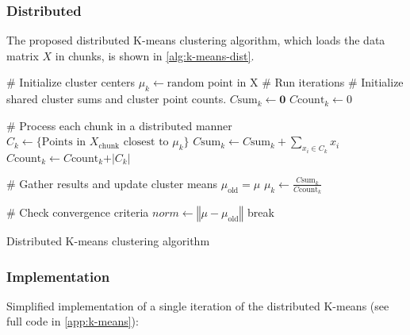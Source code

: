 \subsubsection{Distributed}

The proposed distributed K-means clustering algorithm, which loads the data matrix
$X$ in chunks, is shown in \cref{alg:k-means-dist}.
\begin{algorithm}[H]
  \begin{algorithmic}[1]
    \State \# Initialize cluster centers
      \State $\mu_k \gets \text{random point in X}$
    \EndFor
    \State \# Run iterations
      \State \# Initialize shared cluster sums and cluster point counts.
        \State $C\text{sum}_k \gets \mathbf{0}$
        \State $C\text{count}_k \gets 0$
      \EndFor

      \State \# Process each chunk in a distributed manner
          \State $C_k \gets \{\text{Points in }X_\text{chunk}\text{ closest to }\mu_k\}$
          \State $C\text{sum}_k \gets C\text{sum}_k + \sum_{x_i \in C_k} x_i$
          \State $C\text{count}_k \gets C\text{count}_k + \vert C_k \vert$
        \EndFor
      \EndFor

      \State \# Gather results and update cluster means
      \State $\mu_\text{old} = \mu$
        \State $\mu_k \gets \frac{C\text{sum}_k}{C\text{count}_k}$
      \EndFor

      \State \# Check convergence criteria
      \State $norm \gets \left\Vert \mu - \mu_\text{old} \right\Vert$
        \State break
      \EndIf
    \EndWhile
  \end{algorithmic}
  \caption{Distributed K-means clustering algorithm}
  \label{alg:k-means-dist}
\end{algorithm}

\subsubsection{Implementation}

Simplified implementation of a single iteration of the distributed K-means
(see full code in \cref{app:k-means}):

